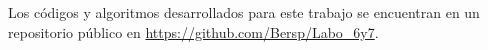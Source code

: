 \documentclass[../main.tex]{subfiles}
\begin{document}
Los códigos y algoritmos desarrollados para este trabajo se encuentran en un repositorio público en \url{https://github.com/Bersp/Labo_6y7}. 
\end{document}
